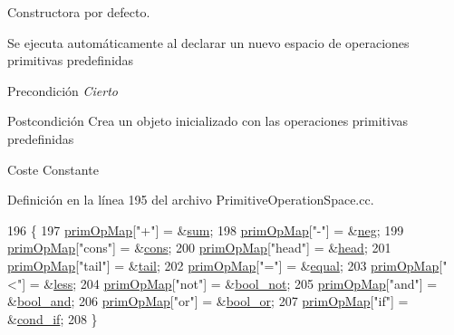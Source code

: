 Constructora por defecto. 

Se ejecuta automáticamente al declarar un nuevo espacio de operaciones primitivas predefinidas \begin{DoxyPrecond}{Precondición}
{\itshape Cierto} 
\end{DoxyPrecond}
\begin{DoxyPostcond}{Postcondición}
Crea un objeto inicializado con las operaciones primitivas predefinidas 
\end{DoxyPostcond}
\begin{DoxyParagraph}{Coste}
Constante 
\end{DoxyParagraph}


Definición en la línea 195 del archivo Primitive\+Operation\+Space.\+cc.


\begin{DoxyCode}
196 \{
197   \hyperlink{class_primitive_operation_space_afd359615001ed1e9b44b9618287834ec}{primOpMap}[\textcolor{stringliteral}{"+"}] = &\hyperlink{class_primitive_operation_space_aa30a58f2003a097535af96ea40b03429}{sum};
198   \hyperlink{class_primitive_operation_space_afd359615001ed1e9b44b9618287834ec}{primOpMap}[\textcolor{stringliteral}{"-"}] = &\hyperlink{class_primitive_operation_space_a2ac4306bae8330f3eb73f5ef8926dfda}{neg};
199   \hyperlink{class_primitive_operation_space_afd359615001ed1e9b44b9618287834ec}{primOpMap}[\textcolor{stringliteral}{"cons"}] = &\hyperlink{class_primitive_operation_space_a4d80dbbbc29a79c286df7c8d7f351111}{cons};
200   \hyperlink{class_primitive_operation_space_afd359615001ed1e9b44b9618287834ec}{primOpMap}[\textcolor{stringliteral}{"head"}] = &\hyperlink{class_primitive_operation_space_a97c2b5092e2465c7deb1aff6ceccc7de}{head};
201   \hyperlink{class_primitive_operation_space_afd359615001ed1e9b44b9618287834ec}{primOpMap}[\textcolor{stringliteral}{"tail"}] = &\hyperlink{class_primitive_operation_space_a08ecc4d0207c93ab245f05732e0024c3}{tail};
202   \hyperlink{class_primitive_operation_space_afd359615001ed1e9b44b9618287834ec}{primOpMap}[\textcolor{stringliteral}{"="}] = &\hyperlink{class_primitive_operation_space_a0a18ec45c82366aea7d1a39ec3b6bb57}{equal};
203   \hyperlink{class_primitive_operation_space_afd359615001ed1e9b44b9618287834ec}{primOpMap}[\textcolor{stringliteral}{"<"}] = &\hyperlink{class_primitive_operation_space_aa5b70cdd115a646d48f686fd49cdedb1}{less};
204   \hyperlink{class_primitive_operation_space_afd359615001ed1e9b44b9618287834ec}{primOpMap}[\textcolor{stringliteral}{"not"}] = &\hyperlink{class_primitive_operation_space_afcb171950067a1a6638b01c916900c78}{bool\_not};
205   \hyperlink{class_primitive_operation_space_afd359615001ed1e9b44b9618287834ec}{primOpMap}[\textcolor{stringliteral}{"and"}] = &\hyperlink{class_primitive_operation_space_a741c40c2ced4d13a87b4ee5c849abdfd}{bool\_and};
206   \hyperlink{class_primitive_operation_space_afd359615001ed1e9b44b9618287834ec}{primOpMap}[\textcolor{stringliteral}{"or"}] = &\hyperlink{class_primitive_operation_space_abb131ec0899228bc3fe2ed54d5c0ebc9}{bool\_or};
207   \hyperlink{class_primitive_operation_space_afd359615001ed1e9b44b9618287834ec}{primOpMap}[\textcolor{stringliteral}{"if"}] = &\hyperlink{class_primitive_operation_space_abbb7fc1afddfa5c5041ac8adfa4a2d55}{cond\_if};
208 \}
\end{DoxyCode}
